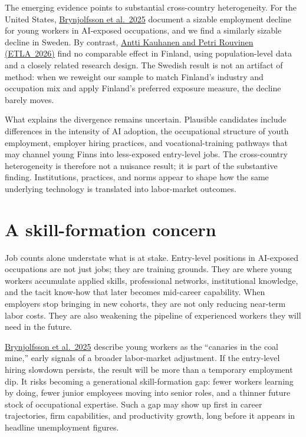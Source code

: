\documentclass[12pt]{article}
\begin{document}
The emerging evidence points to substantial cross-country heterogeneity. For the United States,
\href{https://digitaleconomy.stanford.edu/wp-content/uploads/2025/11/CanariesintheCoalMine_Nov25.pdf}{Brynjolfsson
et al.\ 2025} document a sizable employment decline for young workers in AI-exposed occupations, and
we find a similarly sizable decline in Sweden. By contrast,
\href{https://www.etla.fi/en/publications/working-papers-en/ai-has-not-impacted-the-youth-labor-market-in-finland/}{Antti
Kauhanen and Petri Rouvinen (ETLA~2026)} find no comparable effect in Finland, using population-level
data and a closely related research design. The Swedish result is not an artifact of method: when we
reweight our sample to match Finland's industry and occupation mix and apply Finland's preferred
exposure measure, the decline barely moves.

What explains the divergence remains uncertain. Plausible candidates include differences in the
intensity of AI adoption, the occupational structure of youth employment, employer hiring practices,
and vocational-training pathways that may channel young Finns into less-exposed entry-level jobs. The
cross-country heterogeneity is therefore not a nuisance result; it is part of the substantive finding.
Institutions, practices, and norms appear to shape how the same underlying technology is translated
into labor-market outcomes.

\section*{A skill-formation concern}

Job counts alone understate what is at stake. Entry-level positions in AI-exposed occupations are not
just jobs; they are training grounds. They are where young workers accumulate applied skills,
professional networks, institutional knowledge, and the tacit know-how that later becomes mid-career
capability. When employers stop bringing in new cohorts, they are not only reducing near-term labor
costs. They are also weakening the pipeline of experienced workers they will need in the future.

\href{https://digitaleconomy.stanford.edu/wp-content/uploads/2025/11/CanariesintheCoalMine_Nov25.pdf}{Brynjolfsson
et al.\ 2025} describe young workers as the ``canaries in the coal mine,'' early signals of a broader
labor-market adjustment. If the entry-level hiring slowdown persists, the result will be more than a
temporary employment dip. It risks becoming a generational skill-formation gap: fewer workers learning
by doing, fewer junior employees moving into senior roles, and a thinner future stock of occupational
expertise. Such a gap may show up first in career trajectories, firm capabilities, and productivity
growth, long before it appears in headline unemployment figures.
\end{document}
